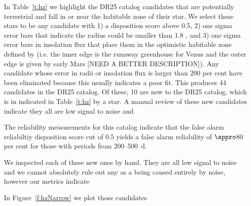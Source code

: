 In Table~\ref{t:hz} we highlight the DR25 catalog candidates that are potentially terrestrial and fall in or near the habitable zone of their star.  We select these stars to be any candidate with 1) a disposition score above 0.5, 2)  one sigma error bars that indicate the radius could be smaller than 1.8 \rearth, and 3) one sigma error bars in insolation flux that place them in the optimistic habitable zone defined by \citet{Kopparapu2013} (i.e. the inner edge is the runaway greenhouse for Venus and the outer edge is given by early Mars [NEED A BETTER DESCRIPTION]). Any candidate whose error in radii or insolation flux is larger than 200 per cent have been eliminated because this usually indicates a poor fit.  This produces 44 candidates in the DR25 catalog. Of these, 10 are new to the DR25 catalog, which is in indicated in Table~\ref{t:hz} by a star.
A manual review of these new candidates indicate they all are low signal to noise and 
 

The reliability measurements for this catalog indicate that the false alarm reliabiltiy  disposition score cut of 0.5 yields a false alarm reliability of $\appro$80 per cent for those with periods from 200--500 \,d.  

We inspected each of these new ones by hand. They are all low signal to noise and we cannot absolutely rule out any as a being caused entirely by noise, however our metrics indicate

In Figure~\ref{f:hzNarrow} we plot those candidates